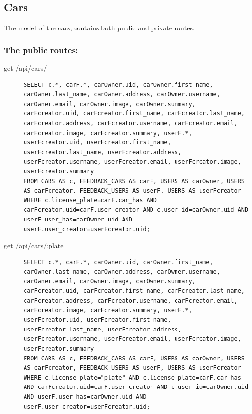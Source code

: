\documentclass{article}
\begin{document}
\subsection{Cars}
The model of the cars, contains both public and private routes.
\subsubsection{The public routes:}
\begin{description}
\item[get /api/cars/] \mbox{}
\begin{lstlisting}[style=sql]
SELECT c.*, carF.*, carOwner.uid, carOwner.first_name, carOwner.last_name, carOwner.address, carOwner.username, carOwner.email, carOwner.image, carOwner.summary, carFcreator.uid, carFcreator.first_name, carFcreator.last_name, carFcreator.address, carFcreator.username, carFcreator.email, carFcreator.image, carFcreator.summary, userF.*, userFcreator.uid, userFcreator.first_name, userFcreator.last_name, userFcreator.address, userFcreator.username, userFcreator.email, userFcreator.image, userFcreator.summary
FROM CARS AS c, FEEDBACK_CARS AS carF, USERS AS carOwner, USERS AS carFcreator, FEEDBACK_USERS AS userF, USERS AS userFcreator
WHERE c.license_plate=carF.car_has AND carFcreator.uid=carF.user_creator AND c.user_id=carOwner.uid AND userF.user_has=carOwner.uid AND userF.user_creator=userFcreator.uid;
\end{lstlisting}
\item[get /api/cars/:plate] \mbox{}
\begin{lstlisting}[style=sql]
SELECT c.*, carF.*, carOwner.uid, carOwner.first_name, carOwner.last_name, carOwner.address, carOwner.username, carOwner.email, carOwner.image, carOwner.summary, carFcreator.uid, carFcreator.first_name, carFcreator.last_name, carFcreator.address, carFcreator.username, carFcreator.email, carFcreator.image, carFcreator.summary, userF.*, userFcreator.uid, userFcreator.first_name, userFcreator.last_name, userFcreator.address, userFcreator.username, userFcreator.email, userFcreator.image, userFcreator.summary
FROM CARS AS c, FEEDBACK_CARS AS carF, USERS AS carOwner, USERS AS carFcreator, FEEDBACK_USERS AS userF, USERS AS userFcreator
WHERE c.license_plate="plate" AND c.license_plate=carF.car_has AND carFcreator.uid=carF.user_creator AND c.user_id=carOwner.uid AND userF.user_has=carOwner.uid AND userF.user_creator=userFcreator.uid;
\end{lstlisting}
\end{description}
\end{document}
